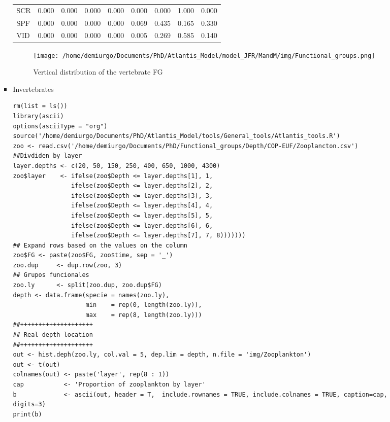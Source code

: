 \documentclass[11pt]{article}
\begin{document}
\begin{itemize}
\begin{itemize}
\begin{itemize}
\begin{table}[htb]
\begin{center}
\begin{tabular}{lrrrrrrrr}
 SCR          &    0.000  &    0.000  &    0.000  &    0.000  &    0.000  &    0.000  &    1.000  &    0.000  \\
 SPF          &    0.000  &    0.000  &    0.000  &    0.000  &    0.069  &    0.435  &    0.165  &    0.330  \\
 VID          &    0.000  &    0.000  &    0.000  &    0.000  &    0.005  &    0.269  &    0.585  &    0.140  \\
\end{tabular}
\end{center}
\end{table}

    \begin{figure}[htb]
    \centering
    \texttt{[image: /home/demiurgo/Documents/PhD/Atlantis\_Model/model\_JFR/MandM/img/Functional\_groups.png]}
    \caption{Vertical distribution of the vertebrate FG}
    \end{figure}
\item Invertebrates

\begin{verbatim}
rm(list = ls())
library(ascii)
options(asciiType = "org")
source('/home/demiurgo/Documents/PhD/Atlantis_Model/tools/General_tools/Atlantis_tools.R')
zoo <- read.csv('/home/demiurgo/Documents/PhD/Functional_groups/Depth/COP-EUF/Zooplancton.csv')
##Divdiden by layer
layer.depths <- c(20, 50, 150, 250, 400, 650, 1000, 4300)
zoo$layer    <- ifelse(zoo$Depth <= layer.depths[1], 1,
                ifelse(zoo$Depth <= layer.depths[2], 2,
                ifelse(zoo$Depth <= layer.depths[3], 3,
                ifelse(zoo$Depth <= layer.depths[4], 4,
                ifelse(zoo$Depth <= layer.depths[5], 5,
                ifelse(zoo$Depth <= layer.depths[6], 6,
                ifelse(zoo$Depth <= layer.depths[7], 7, 8)))))))
## Expand rows based on the values on the column
zoo$FG <- paste(zoo$FG, zoo$time, sep = '_')
zoo.dup     <- dup.row(zoo, 3)
## Grupos funcionales
zoo.ly      <- split(zoo.dup, zoo.dup$FG)
depth <- data.frame(specie = names(zoo.ly),
                    min    = rep(0, length(zoo.ly)),
                    max    = rep(8, length(zoo.ly)))
##++++++++++++++++++++
## Real depth location
##++++++++++++++++++++
out <- hist.deph(zoo.ly, col.val = 5, dep.lim = depth, n.file = 'img/Zooplankton')
out <- t(out)
colnames(out) <- paste('layer', rep(8 : 1))
cap           <- 'Proportion of zooplankton by layer'
b             <- ascii(out, header = T,  include.rownames = TRUE, include.colnames = TRUE, caption=cap, digits=3)
print(b)
\end{verbatim}


\end{itemize}
\end{itemize}
\end{itemize}
\end{document}

